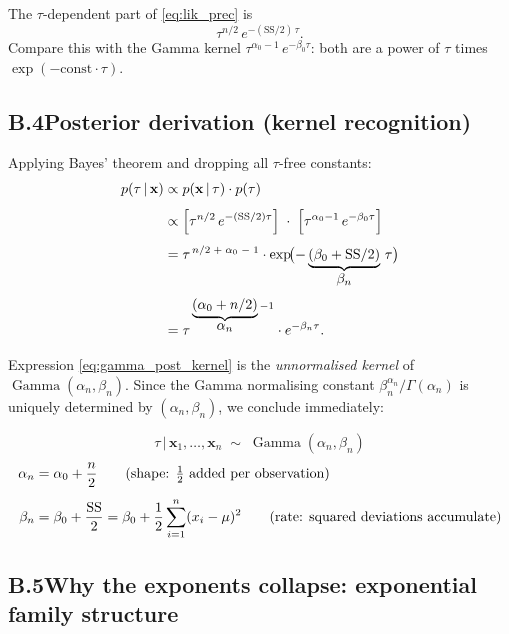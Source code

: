 \documentclass[11pt, a4paper]{article}
\newcommand{\Ga}{\operatorname{Gamma}}
\theoremstyle{definition}
\begin{document}
The $\tau$-dependent part of \eqref{eq:lik_prec} is
\[
  \tau^{n/2}\,e^{-(\mathrm{SS}/2)\,\tau}.
\]
Compare this with the Gamma kernel $\tau^{\alpha_0-1}\,e^{-\beta_0\tau}$:
both are a power of $\tau$ times $\exp(-\mathrm{const}\cdot\tau)$.

\subsection*{B.4\quad Posterior derivation (kernel recognition)}

Applying Bayes' theorem and dropping all $\tau$-free constants:
\begin{align}
  p(\tau\,|\,\mathbf{x})
  &\propto p(\mathbf{x}\,|\,\tau)\cdot p(\tau) \notag\\[4pt]
  &\propto \Bigl[\tau^{n/2}\,e^{-(\mathrm{SS}/2)\tau}\Bigr]
           \;\cdot\;
           \Bigl[\tau^{\alpha_0-1}\,e^{-\beta_0\tau}\Bigr] \notag\\[4pt]
  &= \tau^{\,n/2\;+\;\alpha_0\;-\;1}
     \cdot\exp\!\bigl(-\underbrace{(\beta_0+\mathrm{SS}/2)}_{\displaystyle\beta_n}\,\tau\bigr)
     \notag\\[4pt]
  &= \tau^{\,\underbrace{(\alpha_0+n/2)}_{\displaystyle\alpha_n}-1}
     \cdot e^{-\beta_n\tau}.
  \label{eq:gamma_post_kernel}
\end{align}

Expression \eqref{eq:gamma_post_kernel} is the \emph{unnormalised kernel}
of $\Ga(\alpha_n,\beta_n)$.  Since the Gamma normalising constant
$\beta_n^{\alpha_n}/\Gamma(\alpha_n)$ is uniquely determined by
$(\alpha_n,\beta_n)$, we conclude immediately:

\begin{tcolorbox}[colback=blue!5, colframe=blue!50!black,
  title=Gamma-precision conjugate update, fontupper=\small]
\[
  \tau\,|\,\mathbf{x}_1,\ldots,\mathbf{x}_n
  \;\sim\;
  \Ga(\alpha_n,\beta_n)
\]
\vspace{-6pt}
\begin{align}
  \alpha_n &= \alpha_0 + \frac{n}{2}
    \tag{shape: $\tfrac{1}{2}$ added per observation} \\[4pt]
  \beta_n  &= \beta_0 + \frac{\mathrm{SS}}{2}
    = \beta_0 + \frac{1}{2}\sum_{i=1}^n(x_i-\mu)^2
    \tag{rate: squared deviations accumulate}
\end{align}
\end{tcolorbox}

\subsection*{B.5\quad Why the exponents collapse: exponential family structure}
\end{document}
